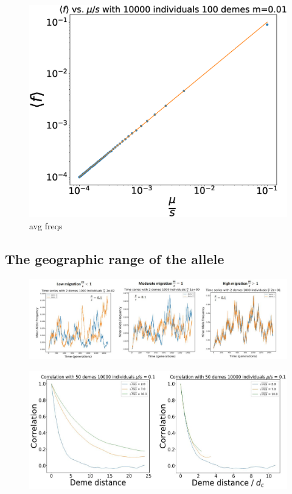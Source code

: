 \begin{figure}[h]
    \centering
    \includegraphics[scale=0.3]{img/fig1.eps}
    \caption{avg freqs}
    \label{fig:avg_freq}
\end{figure}




\subsection{The geographic range of the allele}


\begin{figure}[h]
    \centering
    \includegraphics[scale=0.3]{img/low_high_migration.JPG}
    \caption{}
    \label{fig:}
\end{figure}

\begin{figure}[h]
    \centering
    \includegraphics[scale=0.3]{img/correlation_curve.JPG}
    \caption{}
    \label{fig:}
\end{figure}




